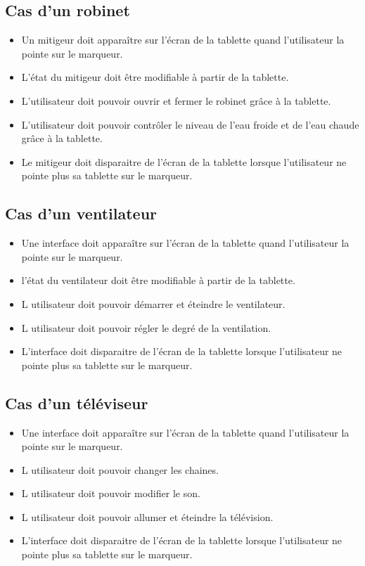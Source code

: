 \documentclass[12pt,a4paper]{article}
\begin{document}
\subsection{Cas d'un robinet}
\begin{itemize} 
  \item Un mitigeur doit apparaître sur l'écran de la tablette quand l'utilisateur la pointe sur le marqueur.
  \item L'état du mitigeur doit être modifiable à partir de la tablette.
  \item L'utilisateur doit pouvoir ouvrir et fermer le robinet grâce à la tablette.
  \item L'utilisateur doit pouvoir contrôler le niveau de l'eau froide et de l'eau chaude grâce à la tablette.
  \item Le mitigeur doit disparaitre de l'écran de la tablette lorsque l'utilisateur ne pointe plus sa tablette sur le marqueur.
\end{itemize}

\subsection{Cas d'un ventilateur}
\begin{itemize} 
  \item Une interface doit apparaître sur l'écran de la tablette quand l'utilisateur la pointe sur le marqueur.
  \item l'état du ventilateur doit être modifiable à partir de la tablette. 
  \item L utilisateur doit pouvoir démarrer et éteindre le ventilateur. 
  \item L utilisateur doit pouvoir régler le degré de la ventilation.
  \item L'interface doit disparaitre de l'écran de la tablette lorsque l'utilisateur ne pointe plus sa tablette sur le marqueur.
\end{itemize}

\subsection{Cas d'un téléviseur}
\begin{itemize} 
  \item Une interface doit apparaître sur l'écran de la tablette quand l'utilisateur la pointe sur le marqueur.
  \item L utilisateur doit pouvoir changer les chaines.
  \item L utilisateur doit pouvoir modifier le son.
  \item L utilisateur doit pouvoir allumer et éteindre la télévision.
  \item L'interface doit disparaitre de l'écran de la tablette lorsque l'utilisateur ne pointe plus sa tablette sur le marqueur.
\end{itemize}
\end{document}
